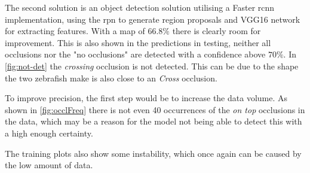 The second solution is an object detection solution utilising a Faster \gls{rcnn} implementation, using the \gls{rpn} to generate region proposals and VGG16 network for extracting features. With a \gls{map} of $66.8\%$ there is clearly room for improvement. This is also shown in the predictions in testing, neither all occlusions nor the "no occlusions" are detected with a confidence above $70\%$. In \autoref{fig:not-det} the \textit{crossing} occlusion is not detected. This can be due to the shape the two zebrafish make is also close to an \textit{Cross} occlusion.

To improve precision, the first step would be to increase the data volume. As shown in \autoref{fig:occlFreq} there is not even 40 occurrences of the \textit{on top} occlusions in the data, which may be a reason for the model not being able to detect this with a high enough certainty.

The training plots also show some instability, which once again can be caused by the low amount of data.\\
